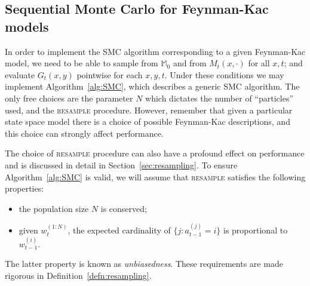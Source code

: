 \subsection{Sequential Monte Carlo for Feynman-Kac models}
\label{sec:SMC_FK}
In order to implement the SMC algorithm corresponding to a given Feynman-Kac model, we need to be able to sample from $\mathbb{M}_0$ and from $M_t(x, \cdot)$ for all $x,t$; and evaluate $G_t(x, y)$ pointwise for each $x,y, t$.
Under these conditions we may implement Algorithm~\ref{alg:SMC}, which describes a generic SMC algorithm. 
The only free choices are the parameter $N$ which dictates the number of ``particles'' used, and the \textsc{resample} procedure.
However, remember that given a particular state space model there is a choice of possible Feynman-Kac descriptions, and this choice can strongly affect performance.

The choice of \textsc{resample} procedure can also have a profound effect on performance and is discussed in detail in Section~\ref{sec:resampling}. To ensure Algorithm~\ref{alg:SMC} is valid, we will assume that \textsc{resample} satisfies the following properties:
\begin{itemize}
\item the population size $N$ is conserved;
\item given $w_t^{(1:N)}$, the expected cardinality of $\{j: a_{t-1}^{(j)} = i\}$ is proportional to $w_{t-1}^{(i)}$.
\end{itemize}
The latter property is known as \emph{unbiasedness}.
These requirements are made rigorous in Definition~\ref{defn:resampling}.

